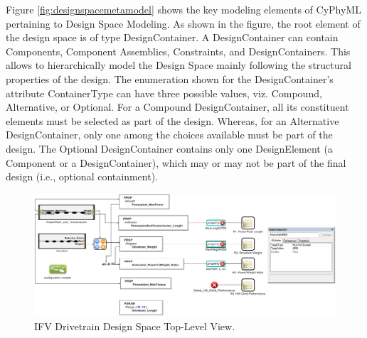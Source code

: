 Figure \ref{fig:designspacemetamodel} shows the key modeling elements of CyPhyML pertaining to Design Space Modeling. As shown in the figure, the root element of the design space is of type DesignContainer. A DesignContainer can contain Components, Component Assemblies, Constraints, and DesignContainers. This allows to hierarchically model the Design Space mainly following the structural properties of the design. The enumeration shown for the DesignContainer's attribute ContainerType can have three possible values, viz. Compound, Alternative, or Optional. For a Compound DesignContainer, all its constituent elements must be selected as part of the design. Whereas, for an Alternative DesignContainer, only one among the choices available must be part of the design. The Optional DesignContainer contains only one DesignElement (a Component or a DesignContainer), which may or may not be part of the final design (i.e., optional containment).

\begin{figure}[t]
\centering
\includegraphics[scale=0.30]{Figures/IFVDrivetrainDesignSpace.png}
\caption{IFV Drivetrain Design Space Top-Level View.}
\label{fig:ifvdrivetraindesignspace}
\end{figure}

